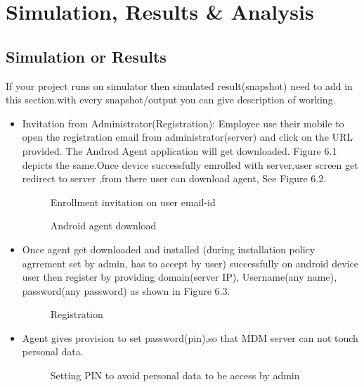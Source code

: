 \graphicspath{ {images/} }
\chapter{Simulation, Results \& Analysis}

\section{Simulation or Results} 
\hspace{5mm} If your project runs on simulator then simulated result(snapshot) need to add in this section.with every snapshot/output you can give description of working.
\begin{itemize}
	\item Invitation from Administrator(Registration): Employee use their mobile to open the registration email from administrator(server) and click on the URL provided. The Androd Agent application will get downloaded. Figure 6.1 depicts the same.Once device successfully emrolled with server,user screen get redirect to server ,from there user can download agent, See Figure 6.2.  
	\begin{figure}[h!]
		\begin{center}
		\end{center}
		\caption {Enrollment invitation on user email-id}
		\label{vmb2}
		\vspace{0mm}
	\end{figure}
	
	\begin{figure}[h!]
		\begin{center}
		\end{center}
		\caption {Android agent download}
		\label{vmb2}
		\vspace{0mm}
	\end{figure} 
	\item Once agent get downloaded and installed (during installation policy agrrement set by admin, has to accept by user) successfully on android device user then register by providing domain(server IP), Username(any name), password(any password) as shown in Figure 6.3.
	\begin{figure}[h!]
		\begin{center}
		\end{center}
		\caption {Registration}
		\label{vmb2}
		\vspace{0mm}
	\end{figure}
	
	\item Agent gives provision to set password(pin),so that MDM server can not touch personal data.
	
	\begin{figure}[h!]
		\begin{center}
		\end{center}
		\caption {Setting PIN to avoid personal data to be access by admin}
		\label{vmb2}
		\vspace{0mm}
	\end{figure}
	\end{itemize}
	
